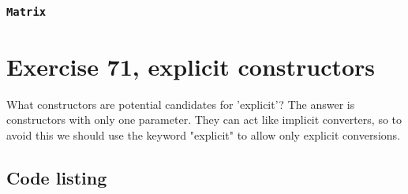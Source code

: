 \documentclass[11pt]{article}
\begin{document}
\subsubsection*{\texttt{Matrix}}



\section*{Exercise 71, explicit constructors}
What constructors are potential candidates for 'explicit'?
The answer is constructors with only one parameter.
They can act like implicit converters, so to avoid this we should use the keyword "explicit" to allow only explicit conversions.

\subsection*{Code listing}

\end{document}
